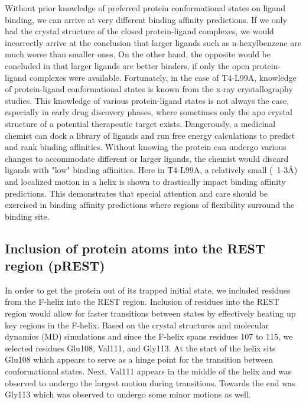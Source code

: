 \documentclass{article}
\begin{document}
Without prior knowledge of preferred protein conformational states on ligand binding, we can arrive at very different binding affinity predictions.
If we only had the crystal structure of the closed protein-ligand complexes, we would incorrectly arrive at the conclusion that larger ligands such as n-hexylbenzene are much worse than smaller ones.
On the other hand, the opposite would be concluded in that larger ligands are better binders, if only the open protein-ligand complexes were available.
Fortunately, in the case of T4-L99A, knowledge of protein-ligand conformational states is known from the x-ray crystallography studies. \cite{Merski2015}
This knowledge of various protein-ligand states is not always the case, especially in early drug discovery phases, where sometimes only the apo crystal structure of a potential therapeutic target exists.
Dangerously, a medicinal chemist can dock a library of ligands and run free energy calculations to predict and rank binding affinities.
Without knowing the protein can undergo various changes to accommodate different or larger ligands, the chemist would discard ligands with "low" binding affinities.
Here in T4-L99A, a relatively small (~1-3\AA) and localized motion in a helix is shown to drastically impact binding affinity predictions.
This demonstrates that special attention and care should be exercised in binding affinity predictions where regions of flexibility surround the binding site.
      
\subsection{Inclusion of protein atoms into the REST region (pREST)}
In order to get the protein out of its trapped initial state, we included residues from the F-helix into the REST region.
Inclusion of residues into the REST region would allow for faster transitions between states by effectively heating up key regions in the F-helix.
Based on the crystal structures and molecular dynamics (MD) simulations and since the F-helix spans residues 107 to 115, we selected residues Glu108, Val111, and Gly113.
At the start of the helix sits Glu108 which appears to serve as a hinge point for the transition between conformational states. 
Next, Val111 appears in the middle of the helix and was observed to undergo the largest motion during transitions. 
Towards the end was Gly113 which was observed to undergo some minor motions as well.
\end{document}

